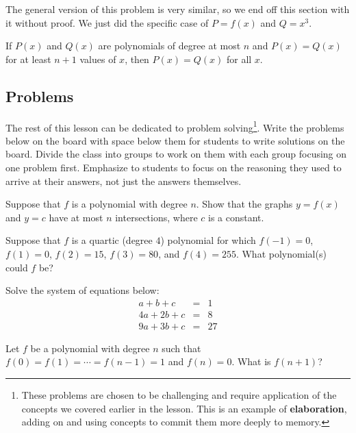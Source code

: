 The general version of this problem is very similar, so we end off this section with it without proof. We just did the specific case of $P = f(x)$ and $Q = x^3$.
\begin{theorem}
    If $P(x)$ and $Q(x)$ are polynomials of degree at most $n$ and $P(x) = Q(x)$ for at least $n+1$ values of $x$, then $P(x) = Q(x)$ for all $x$.
\end{theorem}

\subsection{Problems}

The rest of this lesson can be dedicated to problem solving\footnote{These problems are chosen to be challenging and require application of the concepts we covered earlier in the lesson. This is an example of \textbf{elaboration}, adding on and using concepts to commit them more deeply to memory.}. Write the problems below on the board with space below them for students to write solutions on the board. Divide the class into groups to work on them with each group focusing on one problem first. Emphasize to students to focus on the reasoning they used to arrive at their answers, not just the answers themselves.

\begin{problem}
    Suppose that $f$ is a polynomial with degree $n$. Show that the graphs $y = f(x)$ and $y = c$ have at most $n$ intersections, where $c$ is a constant.
\end{problem}

\begin{problem}
    Suppose that $f$ is a quartic (degree $4$) polynomial for which $f(-1) = 0$, $f(1) = 0$, $f(2) = 15$, $f(3) = 80$, and $f(4) = 255$. What polynomial(s) could $f$ be?
\end{problem}

\begin{problem}
    Solve the system of equations below:
    \begin{eqnarray*}
        a+b+c &=& 1\\
        4a+2b+c &=& 8\\
        9a+3b+c &=& 27
    \end{eqnarray*}
\end{problem}

\begin{problem}
    Let $f$ be a polynomial with degree $n$ such that $f(0) = f(1) = \cdots = f(n-1) = 1$ and $f(n) = 0$. What is $f(n+1)$?
\end{problem}